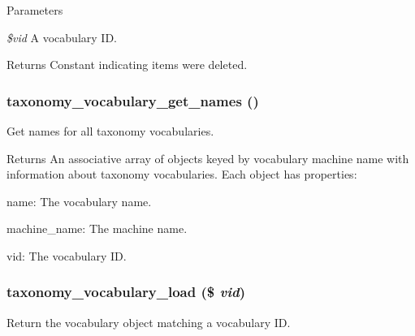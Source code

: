 \begin{DoxyParams}{Parameters}
\item[{\em \$vid}]A vocabulary ID. \end{DoxyParams}
\begin{DoxyReturn}{Returns}
Constant indicating items were deleted. 
\end{DoxyReturn}
\hypertarget{taxonomy_8module_a34d3bbed89236fda7b65952650389ed6}{
\subsubsection[{taxonomy\_\-vocabulary\_\-get\_\-names}]{\setlength{\rightskip}{0pt plus 5cm}taxonomy\_\-vocabulary\_\-get\_\-names ()}}
\label{taxonomy_8module_a34d3bbed89236fda7b65952650389ed6}
Get names for all taxonomy vocabularies.

\begin{DoxyReturn}{Returns}
An associative array of objects keyed by vocabulary machine name with information about taxonomy vocabularies. Each object has properties:
\begin{DoxyItemize}
\item name: The vocabulary name.
\item machine\_\-name: The machine name.
\item vid: The vocabulary ID. 
\end{DoxyItemize}
\end{DoxyReturn}
\hypertarget{taxonomy_8module_ac9a55de2b9018930a690b7dde4f2ddb2}{
\subsubsection[{taxonomy\_\-vocabulary\_\-load}]{\setlength{\rightskip}{0pt plus 5cm}taxonomy\_\-vocabulary\_\-load (\$ {\em vid})}}
\label{taxonomy_8module_ac9a55de2b9018930a690b7dde4f2ddb2}
Return the vocabulary object matching a vocabulary ID.


